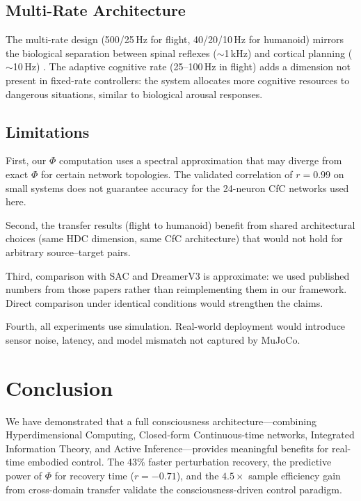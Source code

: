 \documentclass[11pt,a4paper]{article}
\begin{document}
\subsection{Multi-Rate Architecture}

The multi-rate design (500/25\,Hz for flight, 40/20/10\,Hz for humanoid) mirrors the biological separation between spinal reflexes ($\sim$1\,kHz) and cortical planning ($\sim$10\,Hz) \citep{scott2004optimal}.
The adaptive cognitive rate (25--100\,Hz in flight) adds a dimension not present in fixed-rate controllers: the system allocates more cognitive resources to dangerous situations, similar to biological arousal responses.

\subsection{Limitations}

First, our $\Phi$ computation uses a spectral approximation that may diverge from exact $\Phi$ for certain network topologies.
The validated correlation of $r = 0.99$ on small systems does not guarantee accuracy for the 24-neuron CfC networks used here.

Second, the transfer results (flight to humanoid) benefit from shared architectural choices (same HDC dimension, same CfC architecture) that would not hold for arbitrary source--target pairs.

Third, comparison with SAC and DreamerV3 is approximate: we used published numbers from those papers rather than reimplementing them in our framework.
Direct comparison under identical conditions would strengthen the claims.

Fourth, all experiments use simulation.
Real-world deployment would introduce sensor noise, latency, and model mismatch not captured by MuJoCo.

\section{Conclusion}
\label{sec:conclusion}

We have demonstrated that a full consciousness architecture---combining Hyperdimensional Computing, Closed-form Continuous-time networks, Integrated Information Theory, and Active Inference---provides meaningful benefits for real-time embodied control.
The 43\% faster perturbation recovery, the predictive power of $\Phi$ for recovery time ($r = -0.71$), and the $4.5\times$ sample efficiency gain from cross-domain transfer validate the consciousness-driven control paradigm.
\end{document}
